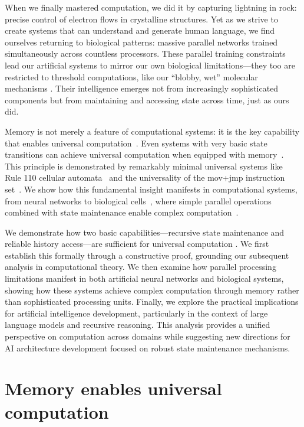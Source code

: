 \documentclass[12pt]{article}
\begin{document}
When we finally mastered computation, we did it by capturing lightning in rock: precise control of electron flows in crystalline structures.
Yet as we strive to create systems that can understand and generate human language, we find ourselves returning to biological patterns: massive parallel networks trained simultaneously across countless processors.
These parallel training constraints lead our artificial systems to mirror our own biological limitations---they too are restricted to threshold computations, like our ``blobby, wet'' molecular mechanisms \cite{alberts2022molecular}.
Their intelligence emerges not from increasingly sophisticated components but from maintaining and accessing state across time, just as ours did.

Memory is not merely a feature of computational systems: it is the key capability that enables universal computation~\cite{turing1936computable}.
Even systems with very basic state transitions can achieve universal computation when equipped with memory~\cite{merrill2023parallelism,peng2024limitations}.
This principle is demonstrated by remarkably minimal universal systems like Rule 110 cellular automata~\cite{cook2004universality} and the universality of the mov+jmp instruction set~\cite{savage1994space}.
We show how this fundamental insight manifests in computational systems, from neural networks to biological cells~\cite{wang2023parallel}, where simple parallel operations combined with state maintenance enable complex computation~\cite{swamy1983space,bisaz2024memory}.

We demonstrate how two basic capabilities---recursive state maintenance and reliable history access---are sufficient for universal computation \cite{savage1994space,bennett1989time}.
We first establish this formally through a constructive proof, grounding our subsequent analysis in computational theory.
We then examine how parallel processing limitations manifest in both artificial neural networks and biological systems, showing how these systems achieve complex computation through memory rather than sophisticated processing units.
Finally, we explore the practical implications for artificial intelligence development, particularly in the context of large language models and recursive reasoning.
This analysis provides a unified perspective on computation across domains while suggesting new directions for AI architecture development focused on robust state maintenance mechanisms.

\section{Memory enables universal computation}
\end{document}
